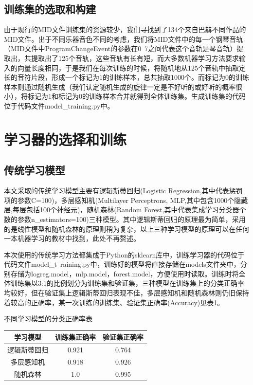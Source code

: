 \documentclass[UTF8,a4paper,10pt]{ctexart}
\begin{document}
\subsection{训练集的选取和构建}
由于现行的MID文件训练集的资源较少，我们寻找到了134个来自巴赫不同作品的MID文件。出于不同乐器音色不同的考虑，我们将MID文件中的每一个钢琴音轨（MID文件中ProgramChangeEvent的参数在0~7之间代表这个音轨是琴音轨）提取出，共提取出了125个音轨，这些音轨有长有短，而大多数机器学习方法要求输入的向量长度相同，于是我们在每次训练的时候，将随机地从125个音轨中抽取定长的音符片段，形成一个标记为1的训练样本，总共抽取1000个。而标记为0的训练样本则通过随机生成（我们认定随机生成的旋律一定是不好听的或好听的概率很小），将标记为1和标记为0的训练样本合并就得到全体训练集。生成训练集的代码位于代码文件model\_training.py中。


\section{\textcolor[rgb]{0,0.3,0.6}{学习器的选择和训练}}
\subsection{传统学习模型}
本文采取的传统学习模型主要有逻辑斯蒂回归(Logistic Regression,其中代表惩罚项的参数C=100)，多层感知机(Multilayer Perceptrons, MLP,其中包含1000个隐藏层,每层包括100个神经元)，随机森林(Random Forest,其中代表集成学习分类器个数的参数n\_estimators=100)三种模型。其中逻辑斯蒂回归的原理最为简单，采用的是线性模型和随机森林的原理则稍为复杂，以上三种学习模型的原理可以在任何一本机器学习的教材中找到，此处不再赘述。

本次使用的传统学习方法都集成于Python的sklearn库中，训练学习器的代码位于代码文件model\_t\ raining.py中，训练好的模型将直接存储在models文件夹中，分别存储为logreg.model，mlp.model，forest.model，方便使用时读取。训练时将全体训练集以3:1的比例划分为训练集和验证集，三种模型在训练集上的分类正确率均较好，但在验证集上逻辑斯蒂回归表现不佳，多层感知机和随机森林则仍旧保持着较高的正确率，某一次训练的训练集、验证集正确率(Accuracy)见表1。
\makeatletter\def\@captype{table}\makeatother
\begin{center}
\caption{不同学习模型的分类正确率表}
\begin{tabular}{c|c|c}
\hline
学习模型 & 训练集正确率 & 验证集正确率 \\ \hline
逻辑斯蒂回归 & 0.921 & 0.764 \\ \hline
多层感知机 & 0.918 &  0.926 \\ \hline
随机森林 & 1.0 & 0.995 \\ \hline
\end{tabular}
\end{center}
\end{document}
